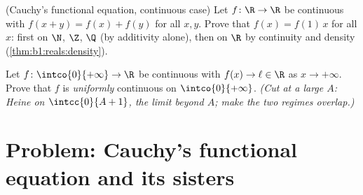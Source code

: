 \begin{exercise}[$\star\star\star$]\label{exo:b1:continuity:11}
(Cauchy's functional equation, continuous case) Let $f \colon \R \to
\R$ be continuous with $f(x + y) = f(x) + f(y)$ for all $x, y$.
Prove that $f(x) = f(1)\,x$ for all $x$: first on $\N$, $\Z$, $\Q$
(by additivity alone), then on $\R$ by continuity and density
(\cref{thm:b1:reals:density}).
\end{exercise}

\begin{exercise}[$\star\star\star$]\label{exo:b1:continuity:12}
Let $f \colon \intco{0}{+\infty} \to \R$ be continuous with
$f(x) \to \ell \in \R$ as $x \to +\infty$. Prove that $f$ is
\emph{uniformly} continuous on $\intco{0}{+\infty}$. \emph{(Cut at a
large $A$: Heine on $\intcc{0}{A+1}$, the limit beyond $A$; make the
two regimes overlap.)}
\end{exercise}

\section{Problem: Cauchy's functional equation and its sisters}

